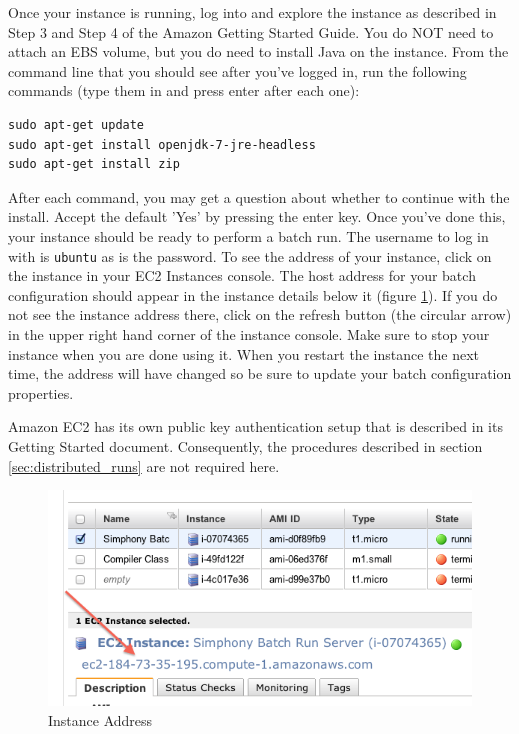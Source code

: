 \documentclass[11pt]{amsart}
\begin{document}
Once your instance is running, log into and explore the instance as described in Step 3 and Step 4 of the Amazon Getting Started Guide. You do NOT need to attach an EBS volume, but you do need to install Java on the instance. From the command line that you should see after you've logged in, run the following commands (type them in and press enter after each one):

\begin{Verbatim}
sudo apt-get update
sudo apt-get install openjdk-7-jre-headless
sudo apt-get install zip
\end{Verbatim}

After each command, you may get a question about whether to continue with the install. Accept the default 'Yes' by pressing the enter key. Once you've done this, your instance should be ready to perform a batch run. The username to log in with is {\tt ubuntu} as is the password. To see the address of your instance, click on the instance in your EC2 Instances console. The host address for your batch configuration should appear in the instance details below it (figure \ref{fig:instance_addr}). If you do not see the instance address there, click on the refresh button (the circular arrow) in the upper right hand corner of the instance console. Make sure to stop your instance when you are done using it. When you restart the instance the next time, the address will have changed so be sure to update your batch configuration properties.

Amazon EC2 has its own public key authentication setup that is described in its Getting Started document. Consequently, the procedures described in section \ref{sec:distributed_runs} are not required here.

 \begin{figure}[h]
\begin{center}
\vspace{.2in}
\centerline {
\includegraphics[width=6in]{images/instance_addr.png}
}
\caption{Instance Address}
\label{fig:instance_addr}
\end{center}
\end{figure}
\end{document}
